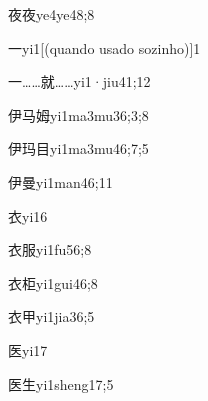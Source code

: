 \begin{verbete}{夜夜}{ye4ye4}{8;8}
\end{verbete}

\begin{verbete}{一}{yi1}[(quando usado sozinho)]{1}
\end{verbete}

\begin{verbete}{一……就……}{yi1·jiu4}{1;12}
\end{verbete}

\begin{verbete}{伊马姆}{yi1ma3mu3}{6;3;8}
\end{verbete}

\begin{verbete}{伊玛目}{yi1ma3mu4}{6;7;5}
\end{verbete}

\begin{verbete}{伊曼}{yi1man4}{6;11}
\end{verbete}

\begin{verbete}{衣}{yi1}{6}
\end{verbete}

\begin{verbete}{衣服}{yi1fu5}{6;8}
\end{verbete}

\begin{verbete}{衣柜}{yi1gui4}{6;8}
\end{verbete}

\begin{verbete}{衣甲}{yi1jia3}{6;5}
\end{verbete}

\begin{verbete}{医}{yi1}{7}
\end{verbete}

\begin{verbete}{医生}{yi1sheng1}{7;5}
\end{verbete}

